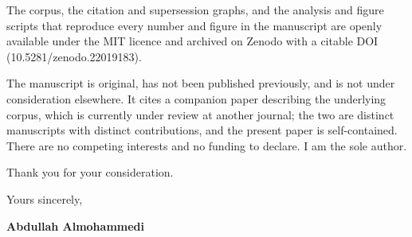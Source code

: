 \documentclass[10.5pt]{letter}
\begin{document}
\vspace{0.5em}
The corpus, the citation and supersession graphs, and the analysis and
figure scripts that reproduce every number and figure in the manuscript are
openly available under the MIT licence and archived on Zenodo with a citable
DOI (10.5281/zenodo.22019183).

\vspace{0.5em}
The manuscript is original, has not been published previously, and is not
under consideration elsewhere. It cites a companion paper describing the
underlying corpus, which is currently under review at another journal; the
two are distinct manuscripts with distinct contributions, and the present
paper is self-contained. There are no competing interests and no funding to
declare. I am the sole author.

\vspace{0.5em}
Thank you for your consideration.

\vspace{0.9em}
\noindent Yours sincerely,

\vspace{1em}
\noindent\textbf{Abdullah Almohammedi}
\end{document}
